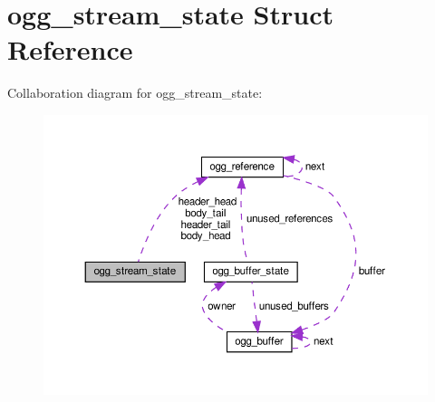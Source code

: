 \hypertarget{structogg__stream__state}{}\section{ogg\+\_\+stream\+\_\+state Struct Reference}
\label{structogg__stream__state}


Collaboration diagram for ogg\+\_\+stream\+\_\+state\+:
\nopagebreak
\begin{figure}[H]
\begin{center}
\leavevmode
\includegraphics[width=350pt]{structogg__stream__state__coll__graph}
\end{center}
\end{figure}
